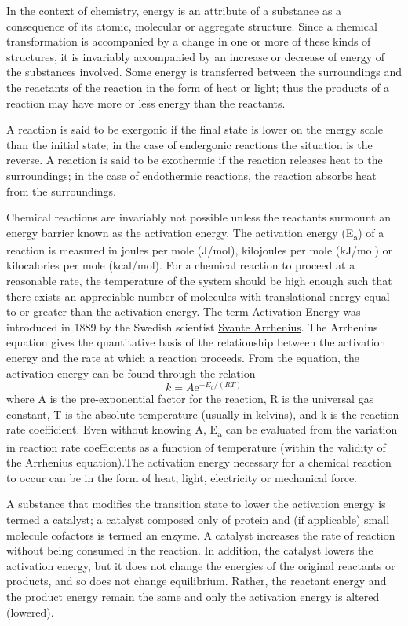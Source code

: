 \documentclass[
]{article}
\begin{document}
In the context of chemistry, energy is an attribute of a substance as a
consequence of its atomic, molecular or aggregate structure. Since a
chemical transformation is accompanied by a change in one or more of
these kinds of structures, it is invariably accompanied by an increase
or decrease of energy of the substances involved. Some energy is
transferred between the surroundings and the reactants of the reaction
in the form of heat or light; thus the products of a reaction may have
more or less energy than the reactants.

A reaction is said to be exergonic if the final state is lower on the
energy scale than the initial state; in the case of endergonic reactions
the situation is the reverse. A reaction is said to be exothermic if the
reaction releases heat to the surroundings; in the case of endothermic
reactions, the reaction absorbs heat from the surroundings.

Chemical reactions are invariably not possible unless the reactants
surmount an energy barrier known as the activation energy. The
activation energy (E\textsubscript{a}) of a reaction is measured in
joules per mole (J/mol), kilojoules per mole (kJ/mol) or kilocalories
per mole (kcal/mol). For a chemical reaction to proceed at a reasonable
rate, the temperature of the system should be high enough such that
there exists an appreciable number of molecules with translational
energy equal to or greater than the activation energy. The term
Activation Energy was introduced in 1889 by the Swedish scientist
\href{https://en.wikipedia.org/wiki/Svante_Arrhenius}{Svante Arrhenius}.
The Arrhenius equation gives the quantitative basis of the relationship
between the activation energy and the rate at which a reaction proceeds.
From the equation, the activation energy can be found through the
relation \[ k=A\mathrm{e}^{-E_a/(RT)} \] where A is the pre-exponential
factor for the reaction, R is the universal gas constant, T is the
absolute temperature (usually in kelvins), and k is the reaction rate
coefficient. Even without knowing A, E\textsubscript{a} can be evaluated
from the variation in reaction rate coefficients as a function of
temperature (within the validity of the Arrhenius equation).The
activation energy necessary for a chemical reaction to occur can be in
the form of heat, light, electricity or mechanical force.

A substance that modifies the transition state to lower the activation
energy is termed a catalyst; a catalyst composed only of protein and (if
applicable) small molecule cofactors is termed an enzyme. A catalyst
increases the rate of reaction without being consumed in the reaction.
In addition, the catalyst lowers the activation energy, but it does not
change the energies of the original reactants or products, and so does
not change equilibrium. Rather, the reactant energy and the product
energy remain the same and only the activation energy is altered
(lowered).
\end{document}
